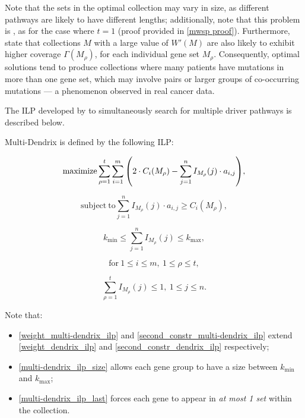 Note that the sets in the optimal collection may vary in size, as different pathways are likely to have different lengths; additionally, note that this problem is \NPComplete, as for the case where $t = 1$ (proof provided in \cref{mwsp proof}). Furthermore, \textcite{multi-dendrix} state that collections $M$ with a large value of $W'(M)$ are also likely to exhibit higher coverage $\Gamma(M_\rho)$, for each individual gene set $M_\rho$. Consequently, optimal solutions tend to produce collections where many patients have mutations in more than one gene set, which may involve pairs or larger groups of co-occurring mutations --- a phenomenon observed in real cancer data.

The ILP developed by \textcite{multi-dendrix} to simultaneously search for multiple driver pathways is described below.

\begin{definition}
    Multi-Dendrix is defined by the following ILP:

    \begin{equation} \label{weight_multi-dendrix_ilp}
        \mathrm{maximize} \sum_{\rho = 1}^t {\sum_{i = 1}^m {\left(2 \cdot C_i(M_\rho) - \sum_{j = 1}^n I_{M_\rho}(j) \cdot a_{i, j}\right)}},
    \end{equation}

    \begin{equation} \label{second_constr_multi-dendrix_ilp}
        \mathrm{subject \ to} \sum_{j = 1}^n I_{M_\rho}(j) \cdot {a_{i, j}} \ge C_i(M_\rho),
    \end{equation}

    \begin{equation} \label{multi-dendrix_ilp_size}
        k_\mathrm{min} \le \sum_{j = 1}^n {I_{M_\rho}(j)} \le k_\mathrm{max},
    \end{equation}
    
    \begin{equation*}
        \mathrm{for\ } 1 \le i \le m, \ 1 \le \rho \le t,
    \end{equation*}

    \begin{equation} \label{multi-dendrix_ilp_last}
        \sum_{\rho = 1}^t{I_{M_\rho}(j)} \le 1, \ 1 \le j \le n.
    \end{equation}
\end{definition}

Note that:

\begin{itemize}
    \item \cref{weight_multi-dendrix_ilp} and \cref{second_constr_multi-dendrix_ilp} extend \cref{weight_dendrix_ilp} and \cref{second_constr_dendrix_ilp} respectively;
    \item \cref{multi-dendrix_ilp_size} allows each gene group to have a size between $k_\mathrm{min}$ and $k_\mathrm{max}$;
    \item \cref{multi-dendrix_ilp_last} forces each gene to appear in \textit{at most 1 set} within the collection. 
\end{itemize}

